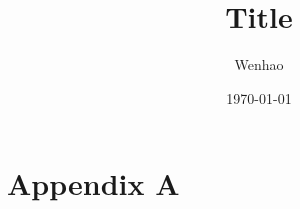 \documentclass{article}
\begin{document}
\title{Title}
\author{Wenhao}
\date{\today}
\maketitle

\section{}

\pagebreak
\section*{Appendix A}
\end{document}
